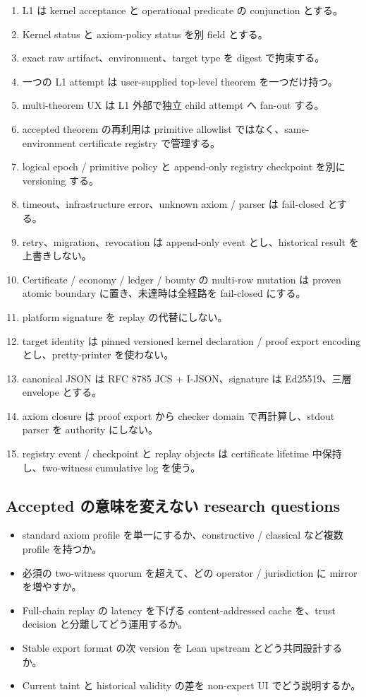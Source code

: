 \documentclass[a4paper,11pt]{ltjsarticle}
\begin{document}
\begin{enumerate}
  \item L1 は kernel acceptance と operational predicate の conjunction とする。
  \item Kernel status と axiom-policy status を別 field とする。
  \item exact raw artifact、environment、target type を digest で拘束する。
  \item 一つの L1 attempt は user-supplied top-level theorem を一つだけ持つ。
  \item multi-theorem UX は L1 外部で独立 child attempt へ fan-out する。
  \item accepted theorem の再利用は primitive allowlist ではなく、same-environment certificate registry で管理する。
  \item logical epoch / primitive policy と append-only registry checkpoint を別に versioning する。
  \item timeout、infrastructure error、unknown axiom / parser は fail-closed とする。
  \item retry、migration、revocation は append-only event とし、historical result を上書きしない。
  \item Certificate / economy / ledger / bounty の multi-row mutation は proven atomic boundary に置き、未達時は全経路を fail-closed にする。
  \item platform signature を replay の代替にしない。
  \item target identity は pinned versioned kernel declaration / proof export encoding とし、pretty-printer を使わない。
  \item canonical JSON は RFC 8785 JCS + I-JSON、signature は Ed25519、三層 envelope とする。
  \item axiom closure は proof export から checker domain で再計算し、stdout parser を authority にしない。
  \item registry event / checkpoint と replay objects は certificate lifetime 中保持し、two-witness cumulative log を使う。
\end{enumerate}

\subsection{Accepted の意味を変えない research questions}

\begin{itemize}
  \item standard axiom profile を単一にするか、constructive / classical など複数 profile を持つか。
  \item 必須の two-witness quorum を超えて、どの operator / jurisdiction に mirror を増やすか。
  \item Full-chain replay の latency を下げる content-addressed cache を、trust decision と分離してどう運用するか。
  \item Stable export format の次 version を Lean upstream とどう共同設計するか。
  \item Current taint と historical validity の差を non-expert UI でどう説明するか。
\end{itemize}
\end{document}
